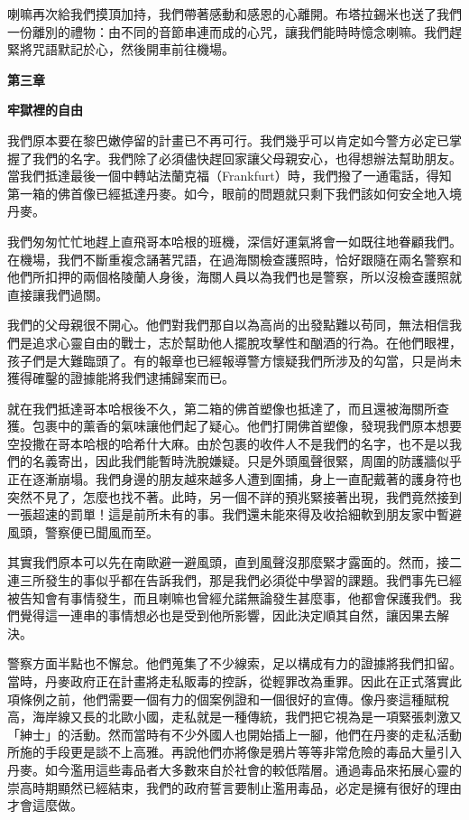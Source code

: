 喇嘛再次給我們摸頂加持，我們帶著感動和感恩的心離開。布塔拉錫米也送了我們一份離別的禮物：由不同的音節串連而成的心咒，讓我們能時時憶念喇嘛。我們趕緊將咒語默記於心，然後開車前往機場。

\textbf{第三章}

\textbf{牢獄裡的自由}

我們原本要在黎巴嫩停留的計畫已不再可行。我們幾乎可以肯定如今警方必定已掌握了我們的名字。我們除了必須儘快趕回家讓父母親安心，也得想辦法幫助朋友。當我們抵達最後一個中轉站法蘭克福（Frankfurt）時，我們撥了一通電話，得知第一箱的佛首像已經抵達丹麥。如今，眼前的問題就只剩下我們該如何安全地入境丹麥。

我們匆匆忙忙地趕上直飛哥本哈根的班機，深信好運氣將會一如既往地眷顧我們。在機場，我們不斷重複念誦著咒語，在過海關檢查護照時，恰好跟隨在兩名警察和他們所扣押的兩個格陵蘭人身後，海關人員以為我們也是警察，所以沒檢查護照就直接讓我們過關。

我們的父母親很不開心。他們對我們那自以為高尚的出發點難以苟同，無法相信我們是追求心靈自由的戰士，志於幫助他人擺脫攻擊性和酗酒的行為。在他們眼裡，孩子們是大難臨頭了。有的報章也已經報導警方懷疑我們所涉及的勾當，只是尚未獲得確鑿的證據能將我們逮捕歸案而已。

就在我們抵達哥本哈根後不久，第二箱的佛首塑像也抵達了，而且還被海關所查獲。包裹中的薰香的氣味讓他們起了疑心。他們打開佛首塑像，發現我們原本想要空投撒在哥本哈根的哈希什大麻。由於包裹的收件人不是我們的名字，也不是以我們的名義寄出，因此我們能暫時洗脫嫌疑。只是外頭風聲很緊，周圍的防護牆似乎正在逐漸崩塌。我們身邊的朋友越來越多人遭到圍捕，身上一直配戴著的護身符也突然不見了，怎麼也找不著。此時，另一個不詳的預兆緊接著出現，我們竟然接到一張超速的罰單！這是前所未有的事。我們還未能來得及收拾細軟到朋友家中暫避風頭，警察便已聞風而至。

其實我們原本可以先在南歐避一避風頭，直到風聲沒那麼緊才露面的。然而，接二連三所發生的事似乎都在告訴我們，那是我們必須從中學習的課題。我們事先已經被告知會有事情發生，而且喇嘛也曾經允諾無論發生甚麼事，他都會保護我們。我們覺得這一連串的事情想必也是受到他所影響，因此決定順其自然，讓因果去解決。

警察方面半點也不懈怠。他們蒐集了不少線索，足以構成有力的證據將我們扣留。當時，丹麥政府正在計畫將走私販毒的控訴，從輕罪改為重罪。因此在正式落實此項條例之前，他們需要一個有力的個案例證和一個很好的宣傳。像丹麥這種賦稅高，海岸線又長的北歐小國，走私就是一種傳統，我們把它視為是一項緊張刺激又「紳士」的活動。然而當時有不少外國人也開始插上一腳，他們在丹麥的走私活動所施的手段更是談不上高雅。再說他們亦將像是鴉片等等非常危險的毒品大量引入丹麥。如今濫用這些毒品者大多數來自於社會的較低階層。通過毒品來拓展心靈的崇高時期顯然已經結束，我們的政府誓言要制止濫用毒品，必定是擁有很好的理由才會這麼做。


